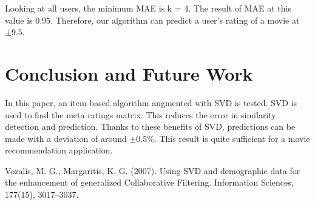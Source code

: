 \documentclass[conference]{IEEEtran}
\begin{document}
Looking at all users, the minimum MAE is k = 4. The result of MAE at this value is 0.95. Therefore, our algorithm can predict a user's rating of a movie at $\pm9.5$. 

\section{Conclusion and Future Work}

In this paper, an item-based algorithm augmented with SVD is tested. SVD is used to find the meta ratings matrix. This reduces the error in similarity detection and prediction. Thanks to these benefits of SVD, predictions can be made with a deviation of around $\pm0.5\%$. This result is quite sufficient for a movie recommendation application.




\begin{thebibliography}{00}
 Vozalis, M. G., Margaritis, K. G. (2007). Using SVD and demographic data for the enhancement of generalized Collaborative Filtering. Information Sciences, 177(15), 3017–3037.
\end{thebibliography}
\end{document}
